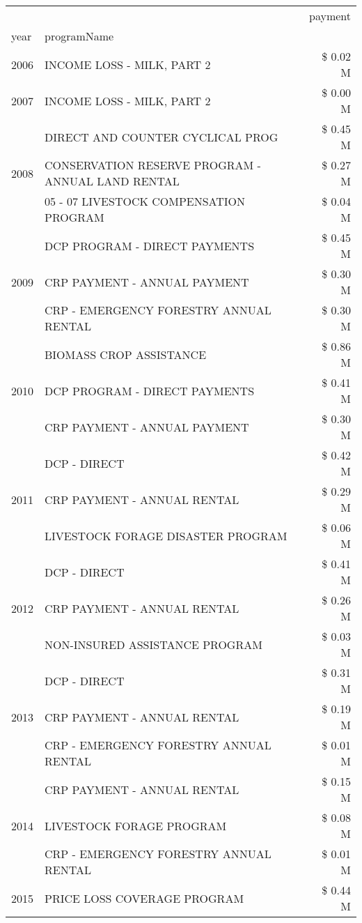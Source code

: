 \begin{tabular}{llr}
\toprule
 &  & payment \\
year & programName &  \\
\midrule
2006 & INCOME LOSS - MILK, PART 2 & \$ 0.02 M \\
\cline{1-3}
2007 & INCOME LOSS - MILK, PART 2 & \$ 0.00 M \\
\cline{1-3}
\multirow[t]{3}{*}{2008} & DIRECT AND COUNTER CYCLICAL PROG & \$ 0.45 M \\
 & CONSERVATION RESERVE PROGRAM - ANNUAL LAND RENTAL & \$ 0.27 M \\
 & 05 - 07 LIVESTOCK COMPENSATION PROGRAM & \$ 0.04 M \\
\cline{1-3}
\multirow[t]{3}{*}{2009} & DCP PROGRAM - DIRECT PAYMENTS & \$ 0.45 M \\
 & CRP PAYMENT - ANNUAL PAYMENT & \$ 0.30 M \\
 & CRP - EMERGENCY FORESTRY ANNUAL RENTAL & \$ 0.30 M \\
\cline{1-3}
\multirow[t]{3}{*}{2010} & BIOMASS CROP ASSISTANCE & \$ 0.86 M \\
 & DCP PROGRAM - DIRECT PAYMENTS & \$ 0.41 M \\
 & CRP PAYMENT - ANNUAL PAYMENT & \$ 0.30 M \\
\cline{1-3}
\multirow[t]{3}{*}{2011} & DCP - DIRECT & \$ 0.42 M \\
 & CRP PAYMENT - ANNUAL RENTAL & \$ 0.29 M \\
 & LIVESTOCK FORAGE DISASTER PROGRAM & \$ 0.06 M \\
\cline{1-3}
\multirow[t]{3}{*}{2012} & DCP - DIRECT & \$ 0.41 M \\
 & CRP PAYMENT - ANNUAL RENTAL & \$ 0.26 M \\
 & NON-INSURED ASSISTANCE PROGRAM & \$ 0.03 M \\
\cline{1-3}
\multirow[t]{3}{*}{2013} & DCP - DIRECT & \$ 0.31 M \\
 & CRP PAYMENT - ANNUAL RENTAL & \$ 0.19 M \\
 & CRP - EMERGENCY FORESTRY ANNUAL RENTAL & \$ 0.01 M \\
\cline{1-3}
\multirow[t]{3}{*}{2014} & CRP PAYMENT - ANNUAL RENTAL & \$ 0.15 M \\
 & LIVESTOCK FORAGE PROGRAM & \$ 0.08 M \\
 & CRP - EMERGENCY FORESTRY ANNUAL RENTAL & \$ 0.01 M \\
\cline{1-3}
\multirow[t]{3}{*}{2015} & PRICE LOSS COVERAGE PROGRAM & \$ 0.44 M \\

\end{tabular}
